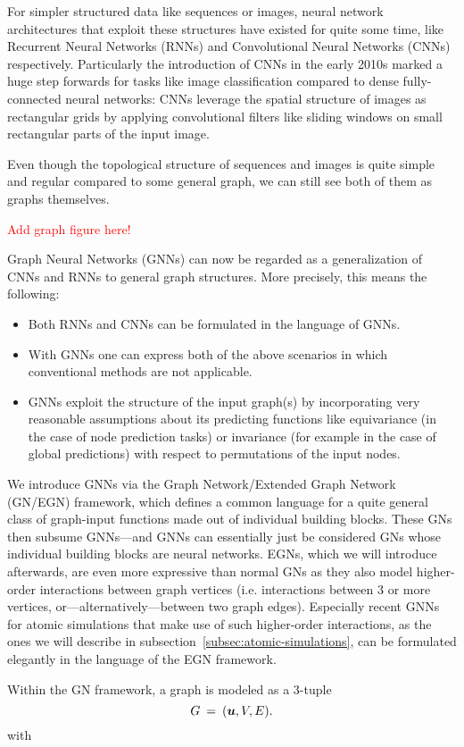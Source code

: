 For simpler structured data like sequences or images, neural
network architectures that exploit these structures have existed for quite some time, like 
Recurrent Neural Networks (RNNs) and
Convolutional Neural Networks (CNNs) respectively. Particularly the introduction of CNNs 
in the early 2010s marked a huge step forwards for tasks like image classification 
compared to dense fully-connected neural networks: CNNs leverage the spatial structure of
images as rectangular grids by applying convolutional filters like sliding windows on small
rectangular parts of the input image. 

Even though the topological structure of sequences and images is quite simple and regular
compared to some general graph, we can still see both of them as graphs themselves. 

\textcolor{red}{Add graph figure here!}

Graph Neural 
Networks (GNNs) can now be regarded as a generalization of CNNs and RNNs to general graph structures.
More precisely, this means the following:

\begin{itemize}
    \item Both RNNs and CNNs can be formulated in the language of GNNs.
    \item With GNNs one can express both of the above scenarios in which conventional
          methods are not applicable.
    \item GNNs exploit the structure of the input graph(s) by incorporating very
          reasonable assumptions about its predicting functions like equivariance
          (in the case of node prediction tasks) or invariance (for example in 
          the case of global predictions) with respect to permutations of the input
          nodes.
\end{itemize}

We introduce GNNs via the Graph Network/Extended Graph Network (GN/EGN) framework, which defines
a common language for a quite general class of graph-input functions made out of 
individual building blocks. These GNs then subsume GNNs---and GNNs can essentially just be 
considered GNs whose individual building blocks are neural networks. 
EGNs, which we will introduce afterwards, are even more expressive than normal 
GNs as they also model higher-order interactions between graph vertices (i.e. interactions 
between 3 or more vertices, or---alternatively---between two graph edges). Especially
recent GNNs for atomic simulations that make use of such higher-order interactions, as the ones 
we will describe in subsection~\ref{subsec:atomic-simulations}, can be formulated elegantly in the
language of the EGN framework.

Within the GN framework, a graph is modeled as a 3-tuple
\[ G \: = \: (\boldsymbol{u}, V, E) \text{.} \]
with 